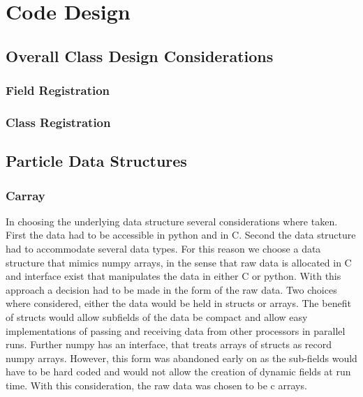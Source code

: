 \section{Code Design}
\subsection{Overall Class Design Considerations}
\subsubsection{Field Registration}
\subsubsection{Class Registration}

\subsection{Particle Data Structures}
\subsubsection{Carray}
In choosing the underlying data structure several considerations where taken. First the
data had to be accessible in python and in C. Second the data structure had to
accommodate several data types. For this reason we choose a data structure that mimics
numpy arrays, in the sense that raw data is allocated in C and interface exist that
manipulates the data in either C or python. With this approach a decision had to be
made in the form of the raw data. Two choices where considered, either the data would
be held in structs or arrays. The benefit of structs would allow subfields of the data
be compact and allow easy implementations of passing and receiving data from other
processors in parallel runs. Further numpy has an interface, that treats
arrays of structs as record numpy arrays. However, this form was abandoned early on
as the sub-fields would have to be hard coded and would not allow the creation of
dynamic fields at run time. With this consideration, the raw data was chosen to be
c arrays. 

